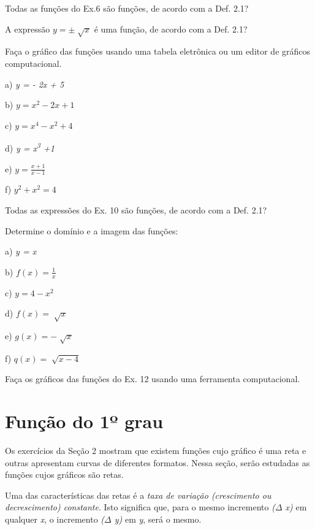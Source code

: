 \begin{exercicios}
\exitem{} Todas as funções do Ex.6 são funções, de acordo com a Def. 2.1?

\exitem{} A expressão  \( y = \pm \sqrt[]{x} \)    é uma função, de acordo com a Def. 2.1?

\exitem{} Faça o gráfico das funções usando uma tabela eletrônica ou um editor de gráficos computacional.

\begin{multicols}{3}
a) \textit{y = - 2x + 5}

b)  \( y=x^{2}-2x+1 \)

c) \textit{  \( y=x^{4}-x^{2}+4 \)}

d) \textit{y = x\textsuperscript{3} +1}

e) \( y=\frac{x+1}{x-1} \) \tab 

f) \( y^{2}+ x^{2}=4 \) 
\end{multicols}

\exitem{} Todas as expressões do Ex. 10 são funções, de acordo com a Def. 2.1?

\exitem{} Determine o domínio e a imagem das funções:

\begin{multicols}{3}
a) \textit{y = x}

b) \( f \left( x \right) =\frac{1}{x} \)

c) \( y=4-x^{2} \)

d)  \( f \left( x \right) =\sqrt[]{x} \)

e)  \( g \left( x \right) =-\sqrt[]{x} \)

f)  \( q \left( x \right) =\sqrt[]{x-4} \)
\end{multicols}

\item Faça os gráficos das funções do Ex. 12 usando uma ferramenta computacional.
\end{exercicios}

\section{Função do 1º grau}

Os exercícios da Seção 2 mostram que existem funções cujo gráfico é uma reta e outras apresentam curvas de diferentes formatos. Nessa seção, serão estudadas as funções cujos gráficos são retas.

Uma das características das retas é a \textit{taxa de variação (crescimento ou decrescimento) constante}. Isto significa que, para o mesmo incremento \textit{($ \Delta $ x) }em qualquer \textit{x}, o incremento \textit{($ \Delta $ y) }em \textit{y}, será o mesmo. 

